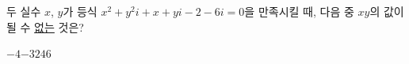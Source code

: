 두 실수 $x$, $y$가 등식 $x^2+y^2i+x+yi-2-6i=0$을 만족시킬 때, 다음 중 $xy$의 값이 될 수 \underline{없는} 것은?
\begin{choices32}{$-4$}{$-3$}{$2$}{$4$}{$6$}\end{choices32}
